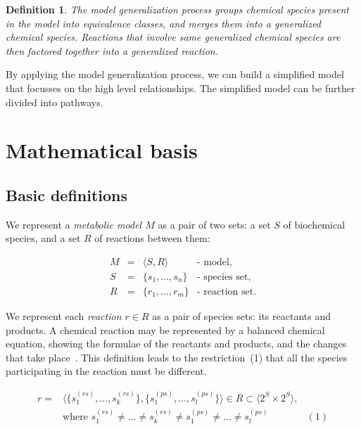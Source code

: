 \documentclass[9pt]{article}
\newcounter{def}
\newcounter{rm}
\begin{document}
\newtheorem{eq00}[def]{Definition}
\begin{eq00}
The \emph{model generalization} process groups chemical species present in the model into equivalence classes, and merges them into a generalized chemical species. Reactions that involve same generalized chemical species are then factored together into a generalized reaction. 
\end{eq00}

By applying the model generalization process, we can build a simplified model that focusses on the high level relationships. The simplified model can be further divided into pathways. 

\newpage
\section*{Mathematical basis}

\subsection*{Basic definitions}

We represent a \emph{metabolic model $M$} as a pair of two sets: a set $S$ of biochemical species, and a set $R$ of reactions between them: 

\[ \begin{array}{ccll}
\mbox{$M$} & \mbox{$=$} & \mbox{$\langle S, R \rangle$} & \mbox{- model,} \\
\mbox{$S$} & \mbox{$=$} & \mbox{$\{s_1, \ldots, s_n\}$} &  \mbox{- species set,} \\
\mbox{$R$} & \mbox{$=$} & \mbox{$\{r_1, \ldots, r_m\}$} &  \mbox{- reaction set.} 
\end{array} \]

We represent each \emph{reaction $r \in R$} as a pair of species sets: its reactants and products. A chemical reaction may be represented by a balanced chemical equation, showing the formulae of the reactants and products, and the changes that take place~\citep{Clugston2000}. This definition leads to the restriction~(1) that all the species participating in the reaction must be different.

\[ \begin{array}{llr}
\mbox{$r = $} & \mbox{$\langle\{s^{(rs)}_1, \ldots, s^{(rs)}_k\},\{s^{(ps)}_1, \ldots, s^{(ps)}_l\}\rangle
\in R \subset \langle 2^S \times 2^S \rangle$}, &\\
& \mbox{where } \mbox{$s^{(rs)}_1 \neq \ldots \neq s^{(rs)}_k \neq s^{(ps)}_1 \neq \ldots \neq s^{(ps)}_l$}  & (1)
\end{array} \]
\end{document}
